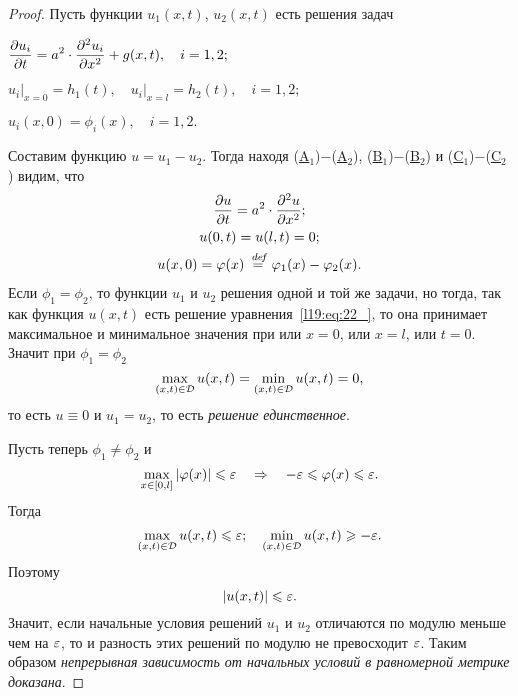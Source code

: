 \begin{proof}
	Пусть функции $u_1(x,t)$, $u_2(x,t)$ есть решения задач
	\begin{enumerateAi}
		\item\label{l19:eq:Ai} $\displaystyle \frac{\partial u_i}{\partial t}=a^2\cdot\frac{\partial^2u_i}{\partial x^2}+g(x,t),\quad i=1,2;$
		\item\label{l19:eq:Bi} $\displaystyle u_i\Big|_{x=0}=h_1(t),\quad u_i\Big|_{x=l}=h_2(t),\quad i=1,2;$ 
		\item\label{l19:eq:Ci} $\displaystyle u_i(x,0)=\phi_i(x),\quad i=1,2.$
	\end{enumerateAi}
	
	Составим функцию $u=u_1-u_2$. Тогда находя (\hyperref[l19:eq:Ai]{A$_1$})$-$(\hyperref[l19:eq:Ai]{A$_2$}), (\hyperref[l19:eq:Bi]{B$_1$})$-$(\hyperref[l19:eq:Bi]{B$_2$}) и (\hyperref[l19:eq:Ci]{C$_1$})$-$(\hyperref[l19:eq:Ci]{C$_2$}) видим, что
	\begin{gather}
		\frac{\partial u}{\partial t}=a^2\cdot\frac{\partial^2u}{\partial x^2};\nonumber\\ 
		u(0,t)=u(l,t)=0;\label{l19:eq:22_}\\ 
		u(x,0)=\varphi(x)\stackrel{\hspace{0.09 cm}de\!f}{=}\varphi_1(x)-\varphi_2(x).\nonumber
	\end{gather}
	Если $\phi_1=\phi_2$, то функции $u_1$ и $u_2$ решения одной и той же задачи, но тогда, так как функция $u(x,t)$ есть решение уравнения~\eqref{l19:eq:22_}, то она принимает максимальное и минимальное значения при или $x=0$, или $x=l$, или $t=0$. Значит при $\phi_1=\phi_2$
	\begin{equation*}
		\max\limits_{(x,t)\in\mathcal{D}}u(x,t)=\min\limits_{(x,t)\in\mathcal{D}}u(x,t)=0,
	\end{equation*}
	то есть $u\equiv0$ и $u_1=u_2$, то есть \emph{решение единственное}.
	
	Пусть теперь $\phi_1\neq\phi_2$ и 
	\begin{equation*}
		\max\limits_{x\in[0,l]}|\varphi(x)|\leqslant\varepsilon\quad\Rightarrow\quad-\varepsilon\leqslant\varphi(x)\leqslant\varepsilon.
	\end{equation*}
	Тогда 
	\begin{equation*}
		\max\limits_{(x,t)\in\mathcal{D}}u(x,t)\leqslant\varepsilon;\quad\min\limits_{(x,t)\in\mathcal{D}}u(x,t)\geqslant-\varepsilon.
	\end{equation*}
	Поэтому
	\begin{equation*}
		|u(x,t)|\leqslant\varepsilon.
	\end{equation*}
	Значит, если начальные условия решений $u_1$ и $u_2$ отличаются по модулю   меньше чем на $\varepsilon$, то и разность этих решений по модулю не превосходит $\varepsilon$. Таким образом \emph{непрерывная зависимость от начальных условий в равномерной метрике доказана}.
\end{proof}

